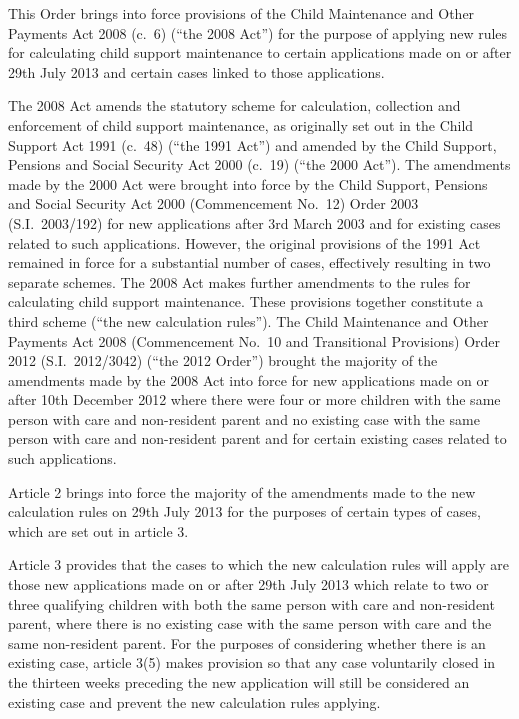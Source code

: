 \documentclass[12pt,a4paper]{article}
\begin{document}
This Order brings into force provisions of the Child Maintenance and Other Payments Act 2008 (c.~6) (“the 2008 Act”) for the purpose of applying new rules for calculating child support maintenance to certain applications made on or after 29th July 2013 and certain cases linked to those applications.

The 2008 Act amends the statutory scheme for calculation, collection and enforcement of child support maintenance, as originally set out in the Child Support Act 1991 (c.~48) (“the 1991 Act”) and amended by the Child Support, Pensions and Social Security Act 2000 (c.~19) (“the 2000 Act”). The amendments made by the 2000 Act were brought into force by the Child Support, Pensions and Social Security Act 2000 (Commencement No.~12) Order 2003 (S.I.~2003/192) for new applications after 3rd March 2003 and for existing cases related to such applications. However, the original provisions of the 1991 Act remained in force for a substantial number of cases, effectively resulting in two separate schemes. The 2008 Act makes further amendments to the rules for calculating child support maintenance. These provisions together constitute a third scheme (“the new calculation rules”). The Child Maintenance and Other Payments Act 2008 (Commencement No.~10 and Transitional Provisions) Order 2012 (S.I.~2012/3042) (“the 2012 Order”) brought the majority of the amendments made by the 2008 Act into force for new applications made on or after 10th December 2012 where there were four or more children with the same person with care and non-resident parent and no existing case with the same person with care and non-resident parent and for certain existing cases related to such applications.

Article 2 brings into force the majority of the amendments made to the new calculation rules on 29th July 2013 for the purposes of certain types of cases, which are set out in article 3.

Article 3 provides that the cases to which the new calculation rules will apply are those new applications made on or after 29th July 2013 which relate to two or three qualifying children with both the same person with care and non-resident parent, where there is no existing case with the same person with care and the same non-resident parent. For the purposes of considering whether there is an existing case, article 3(5) makes provision so that any case voluntarily closed in the thirteen weeks preceding the new application will still be considered an existing case and prevent the new calculation rules applying.
\end{document}
